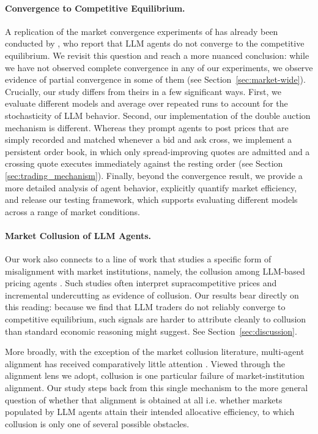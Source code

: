 \documentclass[letterpaper]{article} %
\begin{document}
\paragraph{Convergence to Competitive Equilibrium.} A replication of the market convergence experiments of
\citet{smithExperimentalStudyCompetitive1962} has already been conducted by \citet{jiaExperimentalStudyCompetitive2024}, who report that LLM agents do not converge to the competitive equilibrium. We revisit this question and reach a more nuanced conclusion: while we have not observed complete convergence in any of our experiments, we observe evidence of partial convergence in some of them (see Section~\ref{sec:market-wide}). Crucially, our study differs from theirs in a few significant ways. First, we evaluate different models and average over repeated runs to account for the stochasticity of LLM behavior. Second, our implementation of the double auction mechanism is different. Whereas they prompt agents to post prices that are simply recorded and matched whenever a bid and ask cross, we implement a persistent order book, in which only spread-improving quotes are admitted and a crossing quote executes immediately against the resting order (see Section \ref{sec:trading_mechanism}). Finally, beyond the convergence result, we provide a more detailed analysis of agent behavior, explicitly quantify market efficiency, and release our testing framework, which supports evaluating different models across a range of market conditions.

\paragraph{Market Collusion of LLM Agents.} Our work also connects to a line of work that studies a specific form of misalignment with market institutions, namely, the collusion among LLM-based pricing agents \citep{fishAlgorithmicCollusionLarge2025, linStrategicCollusionLLM2025, agrawalEvaluatingLLMAgent2025}. Such studies often interpret supracompetitive prices and incremental undercutting as evidence of collusion. Our results bear directly on this reading: because we find that LLM traders do not reliably converge to competitive equilibrium, such signals are harder to attribute cleanly to collusion than standard economic reasoning might suggest. See Section~\ref{sec:discussion}. 

More broadly, with the exception of the market collusion literature, multi-agent alignment has received comparatively little attention \citep{carichon2025comingcrisismultiagentmisalignment}. Viewed through the alignment lens we adopt, collusion is one particular failure of market-institution alignment. Our study steps back from this single mechanism to the more general question of whether that alignment is obtained at all i.e. whether markets populated by LLM agents attain their intended allocative efficiency, to which collusion is only one of several possible obstacles.
\end{document}
